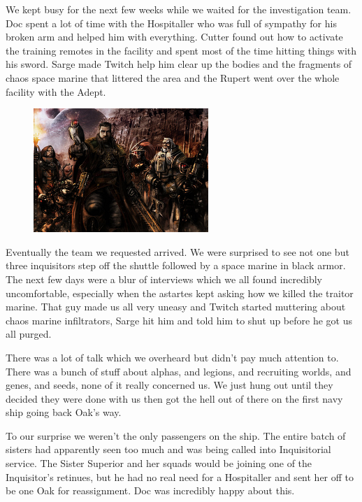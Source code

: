 We kept busy for the next few weeks while we waited for the investigation team. 
Doc spent a lot of time with the Hospitaller who was full of sympathy for his broken arm and helped him with everything. 
Cutter found out how to activate the training remotes in the facility and spent most of the time hitting things with his sword. 
Sarge made Twitch help him clear up the bodies and the fragments of chaos space marine that littered the area and the Rupert went over the whole facility with the Adept.

\begin{figure}
	\begin{center}
		\includegraphics[width=\figwidth]{pics/6/53.png}
	\end{center}
\end{figure}
Eventually the team we requested arrived. 
We were surprised to see not one but three inquisitors step off the shuttle followed by a space marine in black armor. 
The next few days were a blur of interviews which we all found incredibly uncomfortable, especially when the astartes kept asking how we killed the traitor marine. 
That guy made us all very uneasy and Twitch started muttering about chaos marine infiltrators, Sarge hit him and told him to shut up before he got us all purged.

There was a lot of talk which we overheard but didn't pay much attention to. 
There was a bunch of stuff about alphas, and legions, and recruiting worlds, and genes, and seeds, none of it really concerned us. 
We just hung out until they decided they were done with us then got the hell out of there on the first navy ship going back Oak's way.

To our surprise we weren't the only passengers on the ship. 
The entire batch of sisters had apparently seen too much and was being called into Inquisitorial service. 
The Sister Superior and her squads would be joining one of the Inquisitor's retinues, but he had no real need for a Hospitaller and sent her off to be one Oak for reassignment. 
Doc was incredibly happy about this. 


